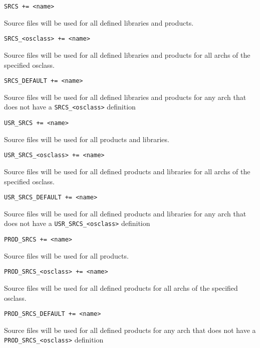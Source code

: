 \begin{description}

\item {}\verb|SRCS += <name>|

Source files will be used for all defined libraries and products.

\item \verb|SRCS_<osclass> += <name>|

Source files will be used for all defined libraries and products for all archs of the specified osclass.

\item \verb|SRCS_DEFAULT += <name>|

Source files will be used for all defined libraries and products for any arch that does not have a 
\verb|SRCS_<osclass>| definition

\item

\item {}\verb|USR_SRCS += <name>|

Source files will be used for all products and libraries.

\item \verb|USR_SRCS_<osclass> += <name>|

Source files will be used for all defined products and libraries for all archs of the specified osclass.

\item \verb|USR_SRCS_DEFAULT += <name>|

Source files will be used for all defined products and libraries for any arch that does not have a 
\verb|USR_SRCS_<osclass>| definition

\item

\item {}\verb|PROD_SRCS += <name>|

Source files will be used for all products.

\item \verb|PROD_SRCS_<osclass> += <name>|

Source files will be used for all defined products for all archs of the specified osclass.

\item \verb|PROD_SRCS_DEFAULT += <name>|

Source files will be used for all defined products for any arch that does not have a \verb|PROD_SRCS_<osclass>| 
definition


\end{description}
